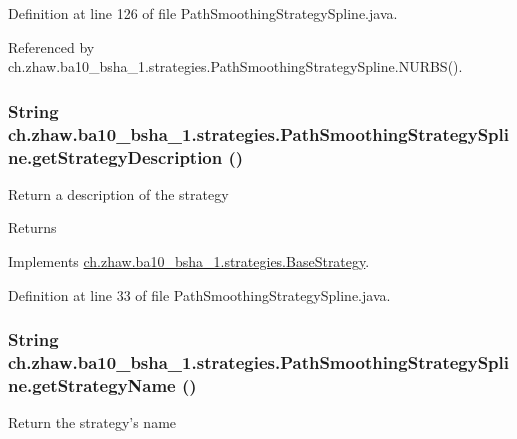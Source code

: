 Definition at line 126 of file PathSmoothingStrategySpline.java.

Referenced by ch.zhaw.ba10\_\-bsha\_\-1.strategies.PathSmoothingStrategySpline.NURBS().\hypertarget{classch_1_1zhaw_1_1ba10__bsha__1_1_1strategies_1_1PathSmoothingStrategySpline_a5ee7b3c0a4ad6cc7ae5aec7feeda34df}{
\subsubsection[{getStrategyDescription}]{\setlength{\rightskip}{0pt plus 5cm}String ch.zhaw.ba10\_\-bsha\_\-1.strategies.PathSmoothingStrategySpline.getStrategyDescription ()}}
\label{classch_1_1zhaw_1_1ba10__bsha__1_1_1strategies_1_1PathSmoothingStrategySpline_a5ee7b3c0a4ad6cc7ae5aec7feeda34df}
Return a description of the strategy

\begin{DoxyReturn}{Returns}

\end{DoxyReturn}


Implements \hyperlink{classch_1_1zhaw_1_1ba10__bsha__1_1_1strategies_1_1BaseStrategy_a75fdb36932ad701f6375cc1fe718056b}{ch.zhaw.ba10\_\-bsha\_\-1.strategies.BaseStrategy}.

Definition at line 33 of file PathSmoothingStrategySpline.java.\hypertarget{classch_1_1zhaw_1_1ba10__bsha__1_1_1strategies_1_1PathSmoothingStrategySpline_a1a91b60b6a706bc2365bc2ae9ab727af}{
\subsubsection[{getStrategyName}]{\setlength{\rightskip}{0pt plus 5cm}String ch.zhaw.ba10\_\-bsha\_\-1.strategies.PathSmoothingStrategySpline.getStrategyName ()}}
\label{classch_1_1zhaw_1_1ba10__bsha__1_1_1strategies_1_1PathSmoothingStrategySpline_a1a91b60b6a706bc2365bc2ae9ab727af}
Return the strategy's name

